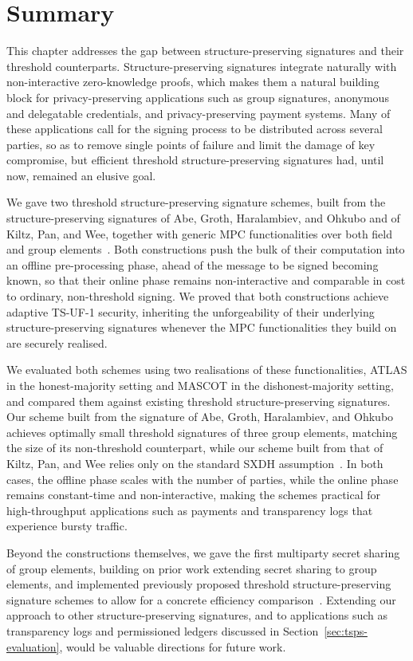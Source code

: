 \section{Summary}\label{sec:tsps-summary}

This chapter addresses the gap between structure-preserving signatures and
their threshold counterparts. Structure-preserving signatures integrate
naturally with non-interactive zero-knowledge proofs, which makes them a
natural building block for privacy-preserving applications such as group
signatures, anonymous and delegatable credentials, and privacy-preserving
payment systems. Many of these applications call for the signing process to
be distributed across several parties, so as to remove single points of
failure and limit the damage of key compromise, but efficient threshold
structure-preserving signatures had, until now, remained an elusive goal.

We gave two threshold structure-preserving signature schemes, built from the
structure-preserving signatures of Abe, Groth, Haralambiev, and Ohkubo and of
Kiltz, Pan, and Wee, together with generic MPC functionalities over both
field and group elements~\cite{C:AGHO11,C:KilPanWee15}. Both
constructions push the bulk of their computation into an offline
pre-processing phase, ahead of the message to be signed becoming known, so
that their online phase remains non-interactive and comparable in cost to
ordinary, non-threshold signing. We proved that both constructions achieve
adaptive TS-UF-1 security, inheriting the unforgeability of their underlying
structure-preserving signatures whenever the MPC functionalities they build
on are securely realised.

We evaluated both schemes using two realisations of these functionalities,
ATLAS in the honest-majority setting and MASCOT in the dishonest-majority
setting, and compared them against existing threshold structure-preserving
signatures. Our scheme built from the signature of Abe, Groth, Haralambiev, and Ohkubo
achieves optimally small threshold signatures of three group elements,
matching the size of its non-threshold counterpart, while our scheme built
from that of Kiltz, Pan, and Wee relies only on the standard SXDH
assumption~\cite{C:AGHO11,C:KilPanWee15}. In both cases, the offline phase
scales with the number of parties, while the online phase remains
constant-time and non-interactive, making the schemes practical for
high-throughput applications such as payments and transparency logs that
experience bursty traffic.

Beyond the constructions themselves, we gave the first multiparty secret
sharing of group elements, building on prior work extending secret sharing to
group elements, and implemented previously proposed threshold
structure-preserving signature schemes to allow for a concrete efficiency
comparison~\cite{NDSS:GPVRNC23}. Extending our approach to other structure-preserving
signatures, and to applications such as transparency logs and permissioned
ledgers discussed in Section~\ref{sec:tsps-evaluation}, would be valuable directions for
future work.

